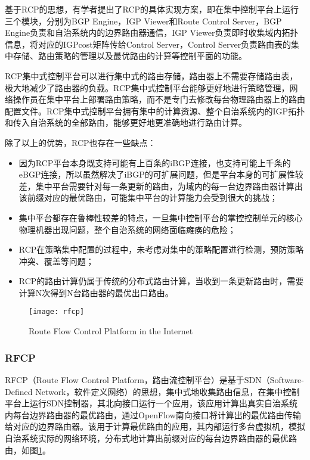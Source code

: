 基于RCP的思想，有学者提出了RCP的具体实现方案\cite{Caldwell2005Design}，即在集中控制平台上运行三个模块，分别为BGP Engine，IGP Viewer和Route Control Server，BGP Engine负责和自治系统内的边界路由器通信，IGP Viewer负责即时收集域内拓扑信息，将对应的IGPcost矩阵传给Control Server，Control Server负责路由表的集中存储、路由策略的管理以及最优路由的计算等控制平面的功能。

RCP集中式控制平台可以进行集中式的路由存储，路由器上不需要存储路由表，极大地减少了路由器的负载。RCP集中式控制平台能够更好地进行策略管理，网络操作员在集中平台上部署路由策略，而不是专门去修改每台物理路由器上的路由配置文件。RCP集中式控制平台拥有集中的计算资源、整个自治系统内的IGP拓扑和传入自治系统的全部路由，能够更好地更准确地进行路由计算。

除了以上的优势，RCP也存在一些缺点\cite{Feamster2004The}：
\begin{itemize}
    \item 因为RCP平台本身既支持可能有上百条的iBGP连接，也支持可能上千条的eBGP连接，所以虽然解决了iBGP的可扩展问题，但是平台本身的可扩展性较差，集中平台需要针对每一条更新的路由，为域内的每一台边界路由器计算出该前缀对应的最优路由，可能集中平台的计算能力会受到很大的挑战；
    \item 集中平台都存在鲁棒性较差的特点，一旦集中控制平台的掌控控制单元的核心物理机器出现问题，整个自治系统的网络面临瘫痪的危险；
    \item RCP在策略集中配置的过程中，未考虑对集中的策略配置进行检测，预防策略冲突、覆盖等问题；
    \item RCP的路由计算仍属于传统的分布式路由计算，当收到一条更新路由时，需要计算N次得到N台路由器的最优出口路由。
\end{itemize}

\begin{figure}
  \centering
  \texttt{[image: rfcp]}
  \caption{Route Flow Control Platform in the Internet\cite{RothenbergHotSDN}}
  \label{fig:rfcp}
\end{figure}

\subsubsection{RFCP\cite{RothenbergHotSDN}}
RFCP（Route Flow Control Platform，路由流控制平台）是基于SDN\cite{sdnsurvey2014ieee}（Software-Defined Network，软件定义网络）的思想，集中式地收集路由信息，在集中控制平台上运行SDN控制器，其北向接口运行一个应用，该应用计算出真实自治系统内每台边界路由器的最优路由，通过OpenFlow\cite{openflow}南向接口将计算出的最优路由传输给对应的边界路由器。该用于计算最优路由的应用，其内部运行多台虚拟机，模拟自治系统实际的网络环境，分布式地计算出前缀对应的每台边界路由器的最优路由，如图\ref{fig:rfcp}。

